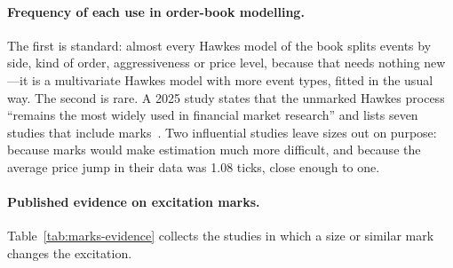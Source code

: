 \paragraph{Frequency of each use in order-book modelling.} The first is standard: almost every Hawkes model of the book
splits events by side, kind of order, aggressiveness or price level, because that needs nothing new---it is a
multivariate Hawkes model with more event types, fitted in the usual way. The second is rare. A 2025 study states
that the unmarked Hawkes process ``remains the most widely used in financial market research'' and lists seven
studies that include marks~\citep{richards2025scoretest}. Two influential studies leave sizes out on purpose:
\citet{bacry2014} because marks would make estimation much more difficult, and \citet{lu2018} because the average
price jump in their data was 1.08 ticks, close enough to one.

\paragraph{Published evidence on excitation marks.} Table~\ref{tab:marks-evidence} collects the studies in which a size or
similar mark changes the excitation.

